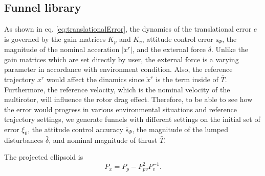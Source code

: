\documentclass[letterpaper, 10 pt, conference]{ieeeconf}  %
\begin{document}
\subsection{Funnel library}
As shown in eq. \eqref{eq:translationalError}, the dynamics of the translational error $e$ is governed by the gain matrices $K_p$ and $K_v$, attitude control error $\text{s}_\Phi$, the magnitude of the nominal acceration $|\ddot{x}^r|$, and the external force $\delta$.  
Unlike the gain matrices which are set directly by user, the external force is a varying parameter in accordance with environment condition.
Also, the reference trajectory $x^r$ would affect the dinamics since $\ddot{x}^r$ is the term inside of $\bar{T}$. Furthermore, the reference velocity, which is the nominal velocity of the multirotor, will influence the rotor drag effect.
Therefore, to be able to see how the error would progress in various environmental situations and reference trajectory settings, 
we generate funnels with different settings on the initial set of error $\xi_0$, the attitude control accuracy $\bar{\text{s}}_\Phi$, 
the magnitude of the lumped disturbances $\bar{\delta}$, and nominal magnitude of thrust $\bar{T}$.



The projected ellipsoid is
\begin{equation}
P_x = P_p - P_{pv}^2 P_v^{-1}. \nonumber
\end{equation}
\end{document}
